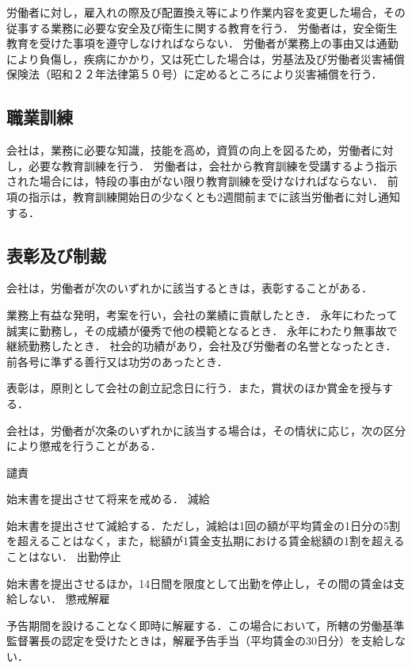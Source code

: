 \documentclass[11pt,a4paper]{jsarticle}
\begin{document}
労働者に対し，雇入れの際及び配置換え等により作業内容を変更した場合，その従事する業務に必要な安全及び衛生に関する教育を行う．
\term
労働者は，安全衛生教育を受けた事項を遵守しなければならない．
労働者が業務上の事由又は通勤により負傷し，疾病にかかり，又は死亡した場合は，労基法及び労働者災害補償保険法（昭和２２年法律第５０号）に定めるところにより災害補償を行う．

\subsection{職業訓練}

会社は，業務に必要な知識，技能を高め，資質の向上を図るため，労働者に対し，必要な教育訓練を行う．
\term
労働者は，会社から教育訓練を受講するよう指示された場合には，特段の事由がない限り教育訓練を受けなければならない．
\term
前項の指示は，教育訓練開始日の少なくとも2週間前までに該当労働者に対し通知する．

\subsection{表彰及び制裁}

会社は，労働者が次のいずれかに該当するときは，表彰することがある．
\begin{enumerate}
	\itm 業務上有益な発明，考案を行い，会社の業績に貢献したとき．
	\itm 永年にわたって誠実に勤務し，その成績が優秀で他の模範となるとき．
	\itm 永年にわたり無事故で継続勤務したとき．
	\itm 社会的功績があり，会社及び労働者の名誉となったとき．
	\itm 前各号に準ずる善行又は功労のあったとき．
\end{enumerate}
\term
表彰は，原則として会社の創立記念日に行う．また，賞状のほか賞金を授与する．

会社は，労働者が次条のいずれかに該当する場合は，その情状に応じ，次の区分により懲戒を行うことがある．
\begin{enumerate}
	\itm 譴責\par 始末書を提出させて将来を戒める．
	\itm 減給\par 始末書を提出させて減給する．ただし，減給は1回の額が平均賃金の1日分の5割を超えることはなく，また，総額が1賃金支払期における賃金総額の1割を超えることはない．
	\itm 出勤停止\par 始末書を提出させるほか，14日間を限度として出勤を停止し，その間の賃金は支給しない．
	\itm 懲戒解雇\par 予告期間を設けることなく即時に解雇する．この場合において，所轄の労働基準監督署長の認定を受けたときは，解雇予告手当（平均賃金の30日分）を支給しない．
\end{enumerate}
\end{document}
